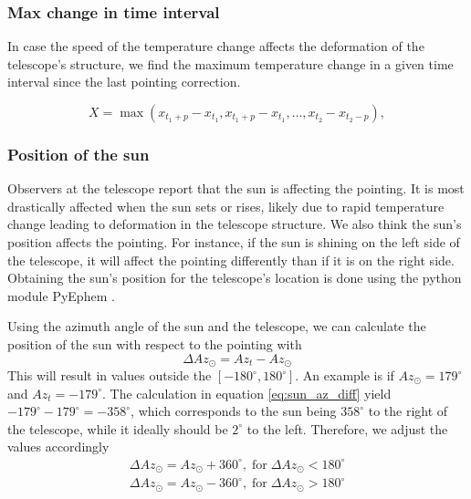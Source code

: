 \subsubsection{Max change in time interval}
In case the speed of the temperature change affects the deformation of the telescope's structure, we find the maximum temperature change in a given time interval since the last pointing correction.

\begin{equation}
    X = \max (x_{t_1+p} - x_{t_1}, x_{t_1+p} - x_{t_1}, \dots, x_{t_2} - x_{t_2-p}),
\end{equation}


\subsubsection{Position of the sun}
Observers at the telescope report that the sun is affecting the pointing.
It is most drastically affected when the sun sets or rises, likely due to rapid temperature change leading to deformation in the telescope structure.
We also think the sun's position affects the pointing.
For instance, if the sun is shining on the left side of the telescope, it will affect the pointing differently than if it is on the right side.
Obtaining the sun's position for the telescope's location is done using the python module PyEphem \cite{ephem}.

Using the azimuth angle of the sun and the telescope, we can calculate the position of the sun with respect to the pointing with
\begin{equation}\label{eq:sun_az_diff}
    \Delta \textit{Az}_\odot = \textit{Az}_{\textit{t}} - \textit{Az}_\odot
\end{equation}
This will result in values outside the $[-180^\circ,180^\circ]$. An example is if $Az_\odot=179^\circ$ and $Az_t = -179^\circ$.
The calculation in equation \eqref{eq:sun_az_diff} yield $-179^\circ-179^\circ=-358^\circ$,
which corresponds to the sun being $358^\circ$ to the right of the telescope, while it ideally should be $2^\circ$ to the left.
Therefore, we adjust the values accordingly
\begin{align}
    \Delta Az_\odot = Az_\odot +360^\circ, \; \text{for} \; \Delta Az_\odot < 180^\circ\\
    \Delta Az_\odot = Az_\odot -360^\circ, \; \text{for} \; \Delta Az_\odot > 180^\circ
\end{align}

